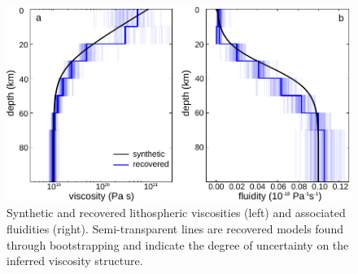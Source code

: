 \begin{figure}\label{figure4}
  \centering
  \includegraphics{ch2/figures/Fig4.pdf}
  \caption{Synthetic and recovered lithospheric viscosities (left)
    and associated fluidities (right).  Semi-transparent lines are recovered
    models found through bootstrapping and indicate the degree of
    uncertainty on the inferred viscosity structure.}
  \label{Figure 4}
\end{figure}

